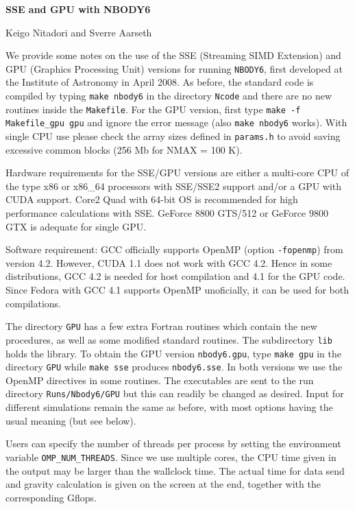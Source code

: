 \documentclass[12pt]{article}
\begin{document}
\centerline {\Large {\bf {SSE and GPU with NBODY6}}}
\bigskip
\bigskip
\centerline {\Large {Keigo Nitadori and Sverre Aarseth~~~}}
\bigskip
\medskip
\bigskip
We provide some notes on the use of the SSE (Streaming SIMD Extension)
and GPU (Graphics Processing Unit) versions for running
{\tt NBODY6}, first developed at the Institute of Astronomy in April 2008. 
As before, the standard code is compiled by typing {\tt make nbody6} in the
directory {\tt Ncode} and there are no new routines inside the {\tt Makefile}.
For the GPU version, first type {\tt make -f Makefile\_gpu gpu} and ignore
the error message (also {\tt make nbody6} works).
With single CPU use please check the array sizes defined in
{\tt params.h} to avoid saving excessive common blocks
(256 Mb for NMAX = 100 K).
\medskip

Hardware requirements for the SSE/GPU versions are either a multi-core
CPU of the type x86 or x86\_64 processors with SSE/SSE2 support and/or
a GPU with CUDA support. Core2 Quad with 64-bit OS is recommended for high
performance calculations with SSE.
GeForce 8800 GTS/512 or GeForce 9800 GTX is adequate for single GPU.
\medskip

Software requirement: GCC officially supports OpenMP (option {\tt -fopenmp}) from
version 4.2.
However, CUDA 1.1 does not work with GCC 4.2.
Hence in some distributions, GCC 4.2 is needed for host compilation and
4.1 for the GPU code.
Since Fedora with GCC 4.1 supports OpenMP unoficially, it can be used
for both compilations.

\medskip

The directory {\tt GPU} has a few extra Fortran routines which contain the
new procedures, as well as some modified standard routines.
The subdirectory {\tt lib} holds the library.
To obtain the GPU version {\tt nbody6.gpu}, type {\tt make gpu} in the 
directory {\tt GPU} while {\tt make sse} produces {\tt nbody6.sse}.
In both versions we use the OpenMP directives in some routines.
The executables are sent to the run directory {\tt Runs/Nbody6/GPU} but
this can readily be changed as desired.
Input for different simulations remain the same as before, with most options
having the usual meaning (but see below).
\medskip

Users can specify the number of threads per process by setting the
environment variable {\tt OMP\_NUM\_THREADS}.
Since we use multiple cores, the CPU time given in the output may be
larger than the wallclock time. The actual time for data send and gravity
calculation is given on the screen at the end, together with the
corresponding Gflops.
\end{document}

